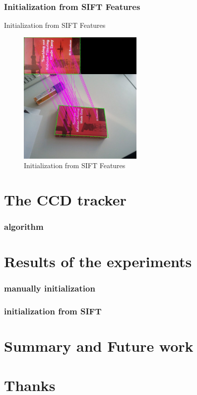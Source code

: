\documentclass[english,10pt,presentation]{beamer}
\begin{document}
\begin{frame}
\frametitle{Initialization from SIFT Features}
\label{sec-5_4}
\begin{block}{Initialization from SIFT Features}
\label{sec-5_4_1}

    \begin{figure}[htb]
    \centering
    \includegraphics[width=6cm,angle=0]{./sift.jpg}
    \caption{\label{fig:sift}Initialization from SIFT Features}
    \end{figure}
\end{block}
\end{frame}
\section{The CCD tracker}
\label{sec-6}
\begin{frame}
\frametitle{algorithm}
\label{sec-6_1}
\end{frame}
\section{Results of the experiments}
\label{sec-7}
\begin{frame}
\frametitle{manually initialization}
\label{sec-7_1}
\end{frame}
\begin{frame}
\frametitle{initialization from SIFT}
\label{sec-7_2}
\end{frame}
\section{Summary and Future work}
\label{sec-8}
\section{Thanks}
\label{sec-9}
\end{document}
